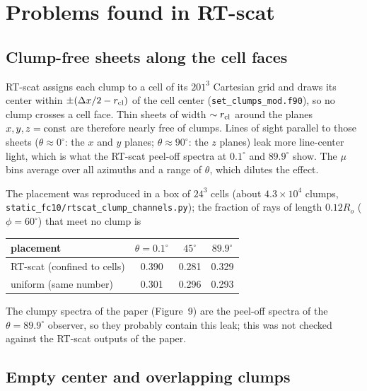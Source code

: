 \documentclass[english,a4paper]{my_memo}
\begin{document}
\section{Problems found in RT-scat}

\subsection{Clump-free sheets along the cell faces}
\label{sec:sheets}

RT-scat assigns each clump to a cell of its $201^3$ Cartesian grid and draws its center
within $\pm(\Delta x/2-r_{\rm cl})$ of the cell center (\texttt{set\_clumps\_mod.f90}), so no
clump crosses a cell face.  Thin sheets of width $\sim r_{\rm cl}$ around the planes
$x,y,z={\rm const}$ are therefore nearly free of clumps.  Lines of sight parallel to those
sheets ($\theta\approx0^\circ$: the $x$ and $y$ planes; $\theta\approx90^\circ$: the $z$ planes)
leak more line-center light, which is what the RT-scat peel-off spectra at $0.1^\circ$ and
$89.9^\circ$ show.  The $\mu$ bins average over all azimuths and a range of $\theta$, which
dilutes the effect.

The placement was reproduced in a box of $24^3$ cells (about $4.3\times10^4$ clumps,
\texttt{static\_fc10/rtscat\_clump\_channels.py}); the fraction of rays of length
$0.12R_o$ ($\phi=60^\circ$) that meet no clump is

\begin{center}
\begin{tabular}{lccc}
\toprule
placement & $\theta=0.1^\circ$ & $45^\circ$ & $89.9^\circ$ \\
\midrule
RT-scat (confined to cells) & 0.390 & 0.281 & 0.329 \\
uniform (same number) & 0.301 & 0.296 & 0.293 \\
\bottomrule
\end{tabular}
\end{center}

The clumpy spectra of the paper (Figure~9) are the peel-off spectra of the
$\theta=89.9^\circ$ observer, so they probably contain this leak; this was not checked
against the RT-scat outputs of the paper.

\subsection{Empty center and overlapping clumps}
\end{document}

